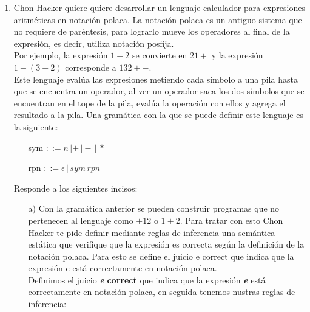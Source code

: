 \documentclass{article}
\begin{document}
    \begin{enumerate}
        \item Chon Hacker quiere quiere desarrollar un lenguaje calculador para expresiones aritméticas en notación polaca. La notación polaca es un antiguo sistema que no requiere de paréntesis, para lograrlo mueve los operadores al final de la expresión, es decir, utiliza notación posfija.\\
        Por ejemplo, la expresión $1 + 2$ se convierte en $2 1 +$ y la expresión $1 - (3 + 2)$ corresponde a $1 3 2 + -$.\\
        Este lenguaje evalúa las expresiones metiendo cada símbolo a una pila hasta que se encuentra un operador, al ver un operador saca los dos símbolos que se encuentran en el tope de la pila, evalúa la operación con ellos y agrega el resultado a la pila.
        Una gramática con la que se puede definir este lenguaje es la siguiente:
        \begin{center}
            \begin{itemize}
                \item[ ] sym $::= n \,| + \,| - \,| \,*$
                \item[ ] rpn $::= \epsilon \,| \,sym \,rpn$
            \end{itemize}
        \end{center}
        Responde a los siguientes incisos:\\
        \begin{itemize}
            \item[a)] Con la gramática anterior se pueden construir programas que no pertenecen al lenguaje como $+1 2$ o $1 + 2$. Para tratar con esto Chon Hacker te pide definir mediante reglas de inferencia una semántica estática que verifique que la expresión es correcta según la definición de la notación polaca. Para esto se define el juicio e correct que indica que la expresión e está correctamente en notación polaca.\\

            Definimos el juicio \textit{\textbf{e}} \textbf{correct} que indica que la expresión \textit{\textbf{e}} está correctamente en notación polaca, en seguida tenemos nustras reglas de inferencia:\\


\end{itemize}
\end{enumerate}
\end{document}
